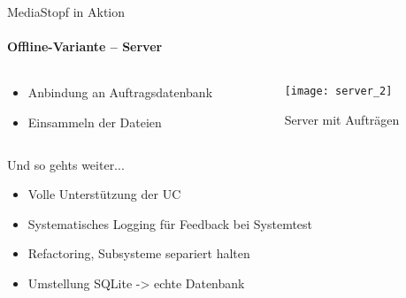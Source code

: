 \documentclass[]{beamer}
\begin{document}
\begin{frame}{MediaStopf in Aktion}
\framesubtitle{Offline-Variante -- Server}
\begin{columns}[t]
  \begin{column}{5cm}
    \begin{itemize}
      \item Anbindung an Auftragsdatenbank
      \item Einsammeln der Dateien
    \end{itemize}
  \end{column}
  \begin{column}{5cm}
    \begin{figure}
      \texttt{[image: server\_2]}
      \caption{Server mit Aufträgen}
    \end{figure}
  \end{column}
\end{columns}
\end{frame}

\begin{frame}{Und so gehts weiter...}
\begin{itemize}
 \item Volle Unterstützung der UC
 \item Systematisches Logging für Feedback bei Systemtest
 \item Refactoring, Subsysteme separiert halten
 \item Umstellung SQLite -> echte Datenbank
\end{itemize}
\end{frame}
\end{document}

